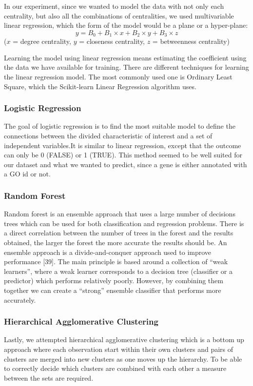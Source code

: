 \documentclass[9pt]{article}
\begin{document}
In our experiment, since we wanted to model the data with not only each centrality, but also all the combinations of centralities, we used multivariable linear regression, which the form of the model would be a plane or a hyper-plane:
\begin{equation}
y=B_0 + B_1\times{x} + B_2\times{y} + B_3\times{z}  
\end{equation}
(\(x\) = degree centrality, \(y\) = closeness centrality, \(z\) = betweenness centrality)

Learning the model using linear regression means estimating the coefficient using the data we have available for training. There are different techniques for learning the linear regression model. The most commonly used one is Ordinary Least Square, which the Scikit-learn Linear Regression algorithm uses. 

\subsubsection{Logistic Regression}
The goal of logistic regression is to find the most suitable model to define the connections between the divided characteristic of interest and a set of independent variables.It is similar to linear regression, except that the outcome can only be 0 (FALSE) or 1 (TRUE). This method seemed to be well suited for our dataset and what we wanted to predict, since a gene is either annotated with a GO id or not.

\subsubsection{Random Forest}
Random forest is an ensemble approach that uses a large number of decisions trees which can be used for both classification and regression problems. There is a direct correlation between the number of trees in the forest and the results obtained, the larger the forest the more accurate the results should be. An ensemble approach is a divide-and-conquer approach used to improve performance [39]. The main principle is based around a collection of “weak learners”, where a weak learner corresponds to a decision tree (classifier or a predictor) which performs relatively poorly. However, by combining them together we can create a “strong” ensemble classifier that performs more accurately. 

\subsubsection{Hierarchical Agglomerative Clustering}
Lastly, we attempted hierarchical agglomerative clustering which is a bottom up approach where each observation start within their own clusters and pairs of clusters are merged into new clusters as one moves up the hierarchy. To be able to correctly decide which clusters are combined with each other a measure between the sets are required. 
\end{document}
